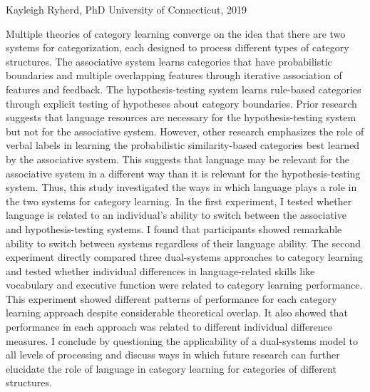 \documentclass[../dissertation.tex]{subfiles}
\begin{document}
\begin{center}
\ptitle
\linebreak
Kayleigh Ryherd, PhD
\linebreak
University of Connecticut, 2019
\end{center}
Multiple theories of category learning converge on the idea that there are two systems for categorization, each designed to process different types of category structures. The associative system learns categories that have probabilistic boundaries and multiple overlapping features through iterative association of features and feedback. The hypothesis-testing system learns rule-based categories through explicit testing of hypotheses about category boundaries. Prior research suggests that language resources are necessary for the hypothesis-testing system but not for the associative system. However, other research emphasizes the role of verbal labels in learning the probabilistic similarity-based categories best learned by the associative system. This suggests that language may be relevant for the associative system in a different way than it is relevant for the hypothesis-testing system. Thus, this study investigated the ways in which language plays a role in the two systems for category learning. In the first experiment, I tested whether language is related to an individual's ability to switch between the associative and hypothesis-testing systems. I found that participants showed remarkable ability to switch between systems regardless of their language ability. The second experiment directly compared three dual-systems approaches to category learning and tested whether individual differences in language-related skills like vocabulary and executive function were related to category learning performance. This experiment showed different patterns of performance for each category learning approach despite considerable theoretical overlap. It also showed that performance in each approach was related to different individual difference measures. I conclude by questioning the applicability of a dual-systems model to all levels of processing and discuss ways in which future research can further elucidate the role of language in category learning for categories of different structures.
\end{document}
